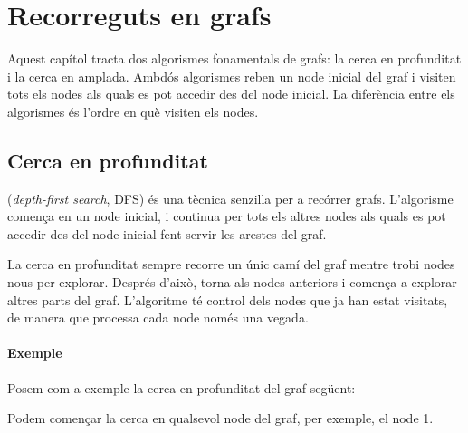 \chapter{Recorreguts en grafs}

Aquest capítol tracta dos algorismes fonamentals de grafs: la cerca
en profunditat i la cerca en amplada. Ambdós algorismes reben un
node inicial del graf i visiten tots els nodes als quals es pot
accedir des del node inicial. La diferència entre els algorismes és
l'ordre en què visiten els nodes.

\section{Cerca en profunditat}


 (\emph{depth-first search}, DFS) és una
tècnica senzilla per a recórrer grafs. L'algorisme comença en un node
inicial, i continua per tots els altres nodes als quals es pot accedir
des del node inicial fent servir les arestes del graf.

La cerca en profunditat sempre recorre un únic camí del graf mentre
trobi nodes nous per explorar. Després d'això, torna als nodes
anteriors i comença a explorar altres parts del graf. L'algoritme té
control dels nodes que ja han estat visitats, de manera que processa
cada node només una vegada.

\subsubsection*{Exemple}

Posem com a exemple la cerca en profunditat del graf següent:
\begin{center}
\end{center}
Podem començar la cerca en qualsevol node del graf, per exemple, el
node 1.

